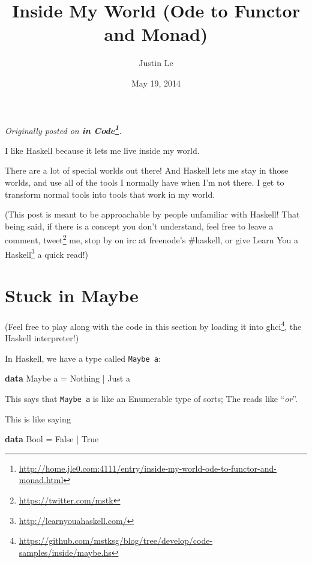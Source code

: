 \documentclass[]{article}
\title{Inside My World (Ode to Functor and Monad)}
\author{Justin Le}
\date{May 19, 2014}
\newenvironment{Shaded}{}{}
\newcommand{\KeywordTok}[1]{\textcolor[rgb]{0.00,0.44,0.13}{\textbf{{#1}}}}
\newcommand{\DataTypeTok}[1]{\textcolor[rgb]{0.56,0.13,0.00}{{#1}}}
\newcommand{\FunctionTok}[1]{\textcolor[rgb]{0.02,0.16,0.49}{{#1}}}
\newcommand{\NormalTok}[1]{{#1}}
\renewcommand{\href}[2]{#2\footnote{\url{#1}}}
\begin{document}
\maketitle

\emph{Originally posted on
\textbf{\href{http://home.jle0.com:4111/entry/inside-my-world-ode-to-functor-and-monad.html}{in
Code}}.}

I like Haskell because it lets me live inside my world.

There are a lot of special worlds out there! And Haskell lets me stay in those worlds, and use all
of the tools I normally have when I'm not there. I get to transform normal tools into tools that
work in my world.

(This post is meant to be approachable by people unfamiliar with Haskell! That being said, if there
is a concept you don't understand, feel free to leave a comment,
\href{https://twitter.com/mstk}{tweet} me, stop by on irc at freenode's \#haskell, or give
\href{http://learnyouahaskell.com/}{Learn You a Haskell} a quick read!)

\section{Stuck in Maybe}\label{stuck-in-maybe}

(Feel free to play along with the code in this section by
\href{https://github.com/mstksg/blog/tree/develop/code-samples/inside/maybe.hs}{loading it into
ghci}, the Haskell interpreter!)

In Haskell, we have a type called \texttt{Maybe\ a}:

\begin{Shaded}
\begin{Highlighting}[]
\KeywordTok{data} \DataTypeTok{Maybe} \NormalTok{a }\FunctionTok{=} \DataTypeTok{Nothing} \FunctionTok{|} \DataTypeTok{Just} \NormalTok{a}
\end{Highlighting}
\end{Shaded}

This says that \texttt{Maybe\ a} is like an Enumerable type of sorts; The \texttt{\textbar{}} reads
like ``\emph{or}''.

This is like saying

\begin{Shaded}
\begin{Highlighting}[]
\KeywordTok{data} \DataTypeTok{Bool} \FunctionTok{=} \DataTypeTok{False} \FunctionTok{|} \DataTypeTok{True}
\end{Highlighting}
\end{Shaded}
\end{document}
